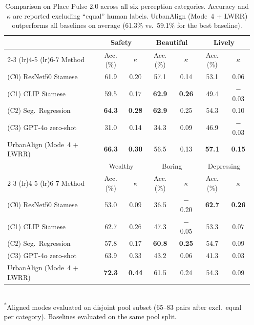 \documentclass[runningheads]{llncs}
\begin{document}
\begin{table}[t]
\centering
\caption{Comparison on Place Pulse 2.0 across all six perception categories. Accuracy and $\kappa$ are reported excluding ``equal'' human labels. UrbanAlign (Mode~4 + LWRR) outperforms all baselines on average (61.3\% vs.\ 59.1\% for the best baseline).}
\label{tab:main}
\small
\begin{tabular}{l c c c c c c}
\toprule
 & \multicolumn{2}{c}{Safety} & \multicolumn{2}{c}{Beautiful} & \multicolumn{2}{c}{Lively} \\
\cmidrule(lr){2-3} \cmidrule(lr){4-5} \cmidrule(lr){6-7}
Method & Acc.(\%) & $\kappa$ & Acc.(\%) & $\kappa$ & Acc.(\%) & $\kappa$ \\
\midrule
(C0) ResNet50 Siamese & 61.9 & 0.20 & 57.1 & 0.14 & 53.1 & 0.06 \\
(C1) CLIP Siamese & 59.5 & 0.17 & \textbf{62.9} & \textbf{0.26} & 49.4 & $-$0.03 \\
(C2) Seg.\ Regression & \textbf{64.3} & \textbf{0.28} & \textbf{62.9} & 0.25 & 54.3 & 0.10 \\
(C3) GPT-4o zero-shot & 31.0 & 0.14 & 34.3 & 0.09 & 46.9 & $-$0.03 \\
UrbanAlign (Mode~4 + LWRR) & \textbf{66.3} & \textbf{0.30} & 56.5 & 0.13 & \textbf{57.1} & \textbf{0.15} \\
\midrule
 & \multicolumn{2}{c}{Wealthy} & \multicolumn{2}{c}{Boring} & \multicolumn{2}{c}{Depressing} \\
\cmidrule(lr){2-3} \cmidrule(lr){4-5} \cmidrule(lr){6-7}
Method & Acc.(\%) & $\kappa$ & Acc.(\%) & $\kappa$ & Acc.(\%) & $\kappa$ \\
\midrule
(C0) ResNet50 Siamese & 53.0 & 0.09 & 36.5 & $-$0.20 & \textbf{62.7} & \textbf{0.26} \\
(C1) CLIP Siamese & 62.7 & 0.26 & 47.3 & $-$0.05 & 53.3 & 0.07 \\
(C2) Seg.\ Regression & 57.8 & 0.17 & \textbf{60.8} & \textbf{0.25} & 54.7 & 0.09 \\
(C3) GPT-4o zero-shot & 63.9 & 0.33 & 43.2 & 0.06 & 41.3 & 0.03 \\
UrbanAlign (Mode~4 + LWRR) & \textbf{72.3} & \textbf{0.44} & 61.5 & 0.24 & 54.3 & 0.09 \\
\bottomrule
\end{tabular}
\\[4pt]
\footnotesize{\textsuperscript{*}Aligned modes evaluated on disjoint pool subset (65--83 pairs after excl.\ equal per category). Baselines evaluated on the same pool split.}
\end{table}
\end{document}
